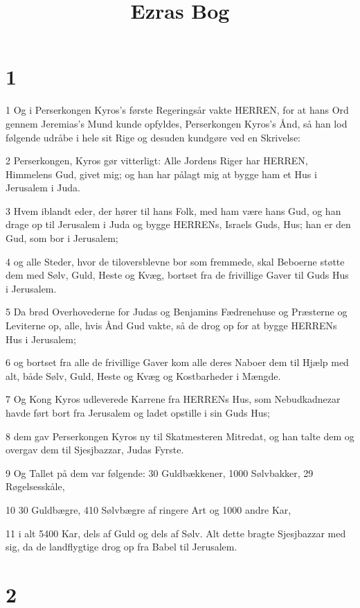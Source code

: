 

\title{Ezras Bog}


\chapter{1}

\par 1 Og i Perserkongen Kyros's første Regeringsår vakte HERREN, for at hans Ord gennem Jeremias's Mund kunde opfyldes, Perserkongen Kyros's Ånd, så han lod følgende udråbe i hele sit Rige og desuden kundgøre ved en Skrivelse:
\par 2 Perserkongen, Kyros gør vitterligt: Alle Jordens Riger har HERREN, Himmelens Gud, givet mig; og han har pålagt mig at bygge ham et Hus i Jerusalem i Juda.
\par 3 Hvem iblandt eder, der hører til hans Folk, med ham være hans Gud, og han drage op til Jerusalem i Juda og bygge HERRENs, Israels Guds, Hus; han er den Gud, som bor i Jerusalem;
\par 4 og alle Steder, hvor de tiloversblevne bor som fremmede, skal Beboerne støtte dem med Sølv, Guld, Heste og Kvæg, bortset fra de frivillige Gaver til Guds Hus i Jerusalem.
\par 5 Da brød Overhovederne for Judas og Benjamins Fædrenehuse og Præsterne og Leviterne op, alle, hvis Ånd Gud vakte, så de drog op for at bygge HERRENs Hus i Jerusalem;
\par 6 og bortset fra alle de frivillige Gaver kom alle deres Naboer dem til Hjælp med alt, både Sølv, Guld, Heste og Kvæg og Kostbarheder i Mængde.
\par 7 Og Kong Kyros udleverede Karrene fra HERRENs Hus, som Nebudkadnezar havde ført bort fra Jerusalem og ladet opstille i sin Guds Hus;
\par 8 dem gav Perserkongen Kyros ny til Skatmesteren Mitredat, og han talte dem og overgav dem til Sjesjbazzar, Judas Fyrste.
\par 9 Og Tallet på dem var følgende: 30 Guldbækkener, 1000 Sølvbakker, 29 Røgelsesskåle,
\par 10 30 Guldbægre, 410 Sølvbægre af ringere Art og 1000 andre Kar,
\par 11 i alt 5400 Kar, dels af Guld og dels af Sølv. Alt dette bragte Sjesjbazzar med sig, da de landflygtige drog op fra Babel til Jerusalem.

\chapter{2}

